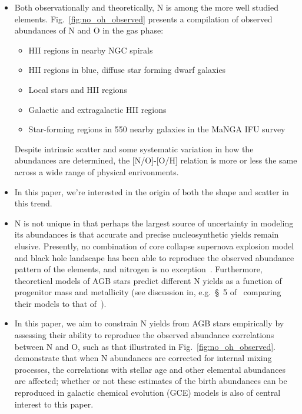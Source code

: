 \documentclass[ms.tex]{subfiles}
\begin{document}
\begin{itemize} 
	\item Both observationally and theoretically, N is among the more well 
	studied elements. 
	Fig.~\ref{fig:no_oh_observed} presents a compilation of observed abundances 
	of N and O in the gas phase: 
	\begin{itemize} 
		\item HII regions in nearby NGC spirals~\citep{Pilyugin2010} 

		\item HII regions in blue, diffuse star forming dwarf 
		galaxies~\citep{Berg2012, Izotov2012, James2015} 

		\item Local stars and HII regions~\citep{Dopita2016} 

		\item Galactic and extragalactic HII regions~\citep{Henry2000} 

		\item Star-forming regions in 550 nearby galaxies in the MaNGA IFU 
		survey~\citep{Belfiore2017} 
	\end{itemize} 
	Despite intrinsic scatter and some systematic variation in how the 
	abundances are determined, the [N/O]-[O/H] relation is more or less the 
	same across a wide range of physical enrivonments. 

	\item In this paper, we're interested in the origin of both the shape and 
	scatter in this trend. 

	\item N is not unique in that perhaps the largest source of uncertainty in 
	modeling its abundances is that accurate and precise nucleosynthetic yields 
	remain elusive. 
	Presently, no combination of core collapse supernova explosion model and 
	black hole landscape has been able to reproduce the observed abundance 
	pattern of the elements, and nitrogen is no exception~\citep{Griffith2021}. 
	Furthermore, theoretical models of AGB stars predict different N yields as 
	a function of progenitor mass and metallicity (see discussion in, 
	e.g.~\S~5 of~\citealp{Karakas2016} comparing their models to that 
	of~\citealp{Cristallo2011, Cristallo2015}). 

	\item In this paper, we aim to constrain N yields from AGB stars 
	empirically by assessing their ability to reproduce the observed abundance 
	correlations between N and O, such as that illustrated in 
	Fig.~\ref{fig:no_oh_observed}. 
	\citet{Vincenzo2021} demonstrate that when N abundances are corrected for 
	internal mixing processes, the correlations with stellar age and other 
	elemental abundances are affected; whether or not these estimates of the 
	birth abundances can be reproduced in galactic chemical evolution (GCE) 
	models is also of central interest to this paper. 


\end{itemize}
\end{document}
